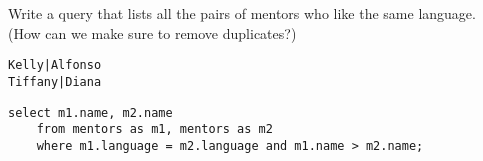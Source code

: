 \begin{blocksection}
\question Write a query that lists all the pairs of mentors who like the same language. (How can we make sure to remove duplicates?)

\begin{lstlisting}
Kelly|Alfonso
Tiffany|Diana
\end{lstlisting}

\begin{solution}[1in]
\begin{lstlisting}
select m1.name, m2.name
    from mentors as m1, mentors as m2
    where m1.language = m2.language and m1.name > m2.name;
\end{lstlisting}
\end{solution}
\end{blocksection}
